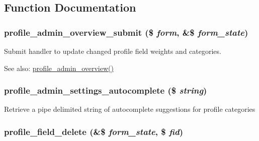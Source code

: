 \subsection{Function Documentation}
\hypertarget{profile_8admin_8inc_010af3295f669ceac61a1da0f8d5ad53}{
\subsubsection[{profile\_\-admin\_\-overview\_\-submit}]{\setlength{\rightskip}{0pt plus 5cm}profile\_\-admin\_\-overview\_\-submit (\$ {\em form}, \/  \&\$ {\em form\_\-state})}}
\label{profile_8admin_8inc_010af3295f669ceac61a1da0f8d5ad53}


Submit handler to update changed profile field weights and categories.

\begin{Desc}
\item[See also:]\hyperlink{group__forms_gf5de7da6a31a83a313aa279ec696e82c}{profile\_\-admin\_\-overview()} \end{Desc}
\hypertarget{profile_8admin_8inc_2952c7f0dfb428dfdf77d7be37b707ad}{
\subsubsection[{profile\_\-admin\_\-settings\_\-autocomplete}]{\setlength{\rightskip}{0pt plus 5cm}profile\_\-admin\_\-settings\_\-autocomplete (\$ {\em string})}}
\label{profile_8admin_8inc_2952c7f0dfb428dfdf77d7be37b707ad}


Retrieve a pipe delimited string of autocomplete suggestions for profile categories \hypertarget{profile_8admin_8inc_6f272a26ed8740d2674718fc5f605c0c}{
\subsubsection[{profile\_\-field\_\-delete}]{\setlength{\rightskip}{0pt plus 5cm}profile\_\-field\_\-delete (\&\$ {\em form\_\-state}, \/  \$ {\em fid})}}
\label{profile_8admin_8inc_6f272a26ed8740d2674718fc5f605c0c}


